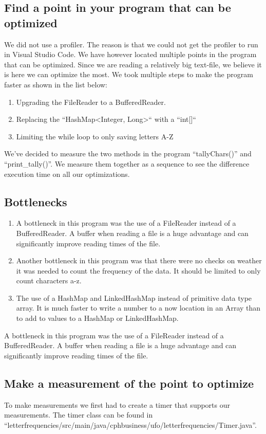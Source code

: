 \documentclass{article}
\begin{document}
\subsection{Find a point in your program that can be optimized}
We did not use a profiler. The reason is that we could not get 
the profiler to run in Visual Studio Code. We have however located 
multiple points in the program that can be optimized. Since we are 
reading a relatively big text-file, we believe it is here we can 
optimize the most. We took multiple steps to make the program faster
as shown in the list below:
\begin{enumerate}
    \item Upgrading the FileReader to a BufferedReader.
    \item Replacing the ``HashMap\textless Integer, Long\textgreater`` with a ``int[]``
    \item Limiting the while loop to only saving letters A-Z
\end{enumerate}
We've decided to measure the two methods in the program ``tallyChars()'' and ``print\_tally()''. 
We measure them together as a sequence to see the difference execution time on all our optimizations. 

\subsection{Bottlenecks}
\begin{enumerate}
  \item A bottleneck in this program was the use of a FileReader instead of a BufferedReader. 
  A buffer when reading a file is a huge advantage and can significantly improve reading times of the file.
  \item Another bottleneck in this program was that there were no checks on weather it was needed to count 
  the frequency of the data. It should be limited to only count characters a-z.
  \item The use of a HashMap and LinkedHashMap instead of primitive data type array. It is much faster to 
  write a number to a now location in an Array than to add to values to a HashMap or LinkedHashMap.
\end{enumerate}
A bottleneck in this program was the use of a FileReader instead of a BufferedReader. 
A buffer when reading a file is a huge advantage and can significantly improve reading times of the file. 


\subsection{Make a measurement of the point to optimize}
To make measurements we first had to create a timer that supports our 
measurements. The timer class can be found in 
``letterfrequencies/src/main/java/cphbusiness/ufo/letterfrequencies/Timer.java''.
\end{document}
